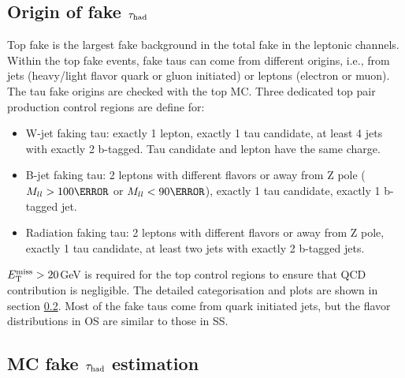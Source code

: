 \subsection{Origin of fake $\tau_\text{had}$}
\label{sec:fake_origin}

Top fake is the largest fake background in the total fake in the leptonic channels. 
Within the top fake events, fake taus can come from different origins, i.e., from jets (heavy/light flavor quark or gluon initiated) 
or leptons (electron or muon). The tau fake 
origins are checked with the top MC. Three dedicated top pair production control regions are define for:
\begin{itemize}
\item{W-jet faking tau: exactly 1 lepton, exactly 1 tau candidate, at least 4 jets with exactly 2 b-tagged. Tau candidate and lepton have the same charge.}
\item{B-jet faking tau: 2 leptons with different flavors or away from Z pole ($M_{ll}>100\GeV$ or $M_{ll}<90\GeV$), exactly 1 tau candidate, exactly 1 b-tagged jet.}
\item{Radiation faking tau: 2 leptons with different flavors or away from Z pole, exactly 1 tau candidate, at least two jets with exactly 2 b-tagged jets.}
\end{itemize}
$E_{\text{T}}^{\text{miss}} > 20$GeV is required for the top control regions to ensure that QCD contribution is negligible. The detailed categorisation and plots are shown in section \ref{sec:sf_method}.
Most of the fake taus come from quark initiated jets, but the flavor distributions in OS are similar to those in SS. 

\subsection{MC fake $\tau_\text{had}$ estimation}
\label{sec:sf_method}

